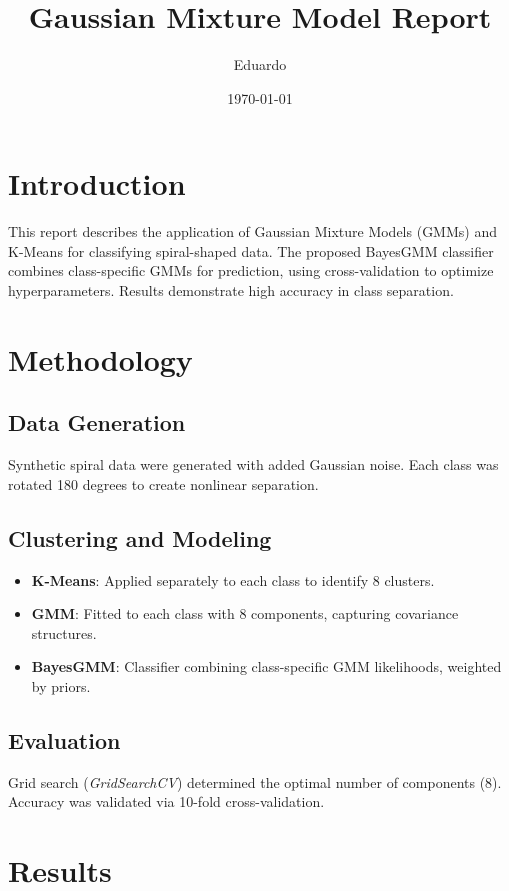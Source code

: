 \documentclass[a4paper,12pt]{article}
\title{Gaussian Mixture Model Report}
\author{Eduardo}
\date{\today}
\begin{document}
\maketitle

\section{Introduction}
This report describes the application of Gaussian Mixture Models (GMMs) and K-Means for classifying spiral-shaped data. The proposed BayesGMM classifier combines class-specific GMMs for prediction, using cross-validation to optimize hyperparameters. Results demonstrate high accuracy in class separation.

\section{Methodology}
\subsection{Data Generation}
Synthetic spiral data were generated with added Gaussian noise. Each class was rotated 180 degrees to create nonlinear separation.

\subsection{Clustering and Modeling}
\begin{itemize}
  \item \textbf{K-Means}: Applied separately to each class to identify 8 clusters.
  \item \textbf{GMM}: Fitted to each class with 8 components, capturing covariance structures.
  \item \textbf{BayesGMM}: Classifier combining class-specific GMM likelihoods, weighted by priors.
\end{itemize}

\subsection{Evaluation}
Grid search (\textit{GridSearchCV}) determined the optimal number of components (8). Accuracy was validated via 10-fold cross-validation.

\section{Results}
\end{document}
